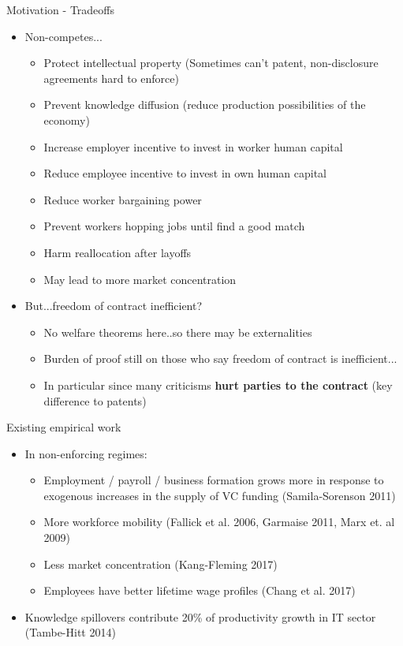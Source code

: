 \documentclass[english,usenames,dvipsnames]{beamer}
\begin{document}
\begin{frame}{Motivation - Tradeoffs}
\begin{itemize}
	
	\small
	\item Non-competes...
	\begin{itemize}
		\footnotesize
		\item Protect intellectual property (Sometimes can't patent, non-disclosure agreements hard to enforce)
		\item Prevent knowledge diffusion (reduce production possibilities of the economy)
		\item Increase employer incentive to invest in worker human capital
		\item Reduce employee incentive to invest in own human capital 
		\item Reduce worker bargaining power
		\item Prevent workers hopping jobs until find a good match
		\item Harm reallocation after layoffs
		\item May lead to more market concentration
	\end{itemize}

	\small
	\item But...freedom of contract inefficient? 
	\begin{itemize}
		\footnotesize
		\item No welfare theorems here..so there may be externalities
		\item Burden of proof still on those who say freedom of contract is inefficient...
		\item In particular since many criticisms \textbf{hurt parties to the contract} (key difference to patents)
	\end{itemize}

\end{itemize}
\end{frame}

\begin{frame}{Existing empirical work}
\begin{itemize}
	\item In non-enforcing regimes:
	\begin{itemize}
		\item Employment / payroll / business formation grows more in response to exogenous increases in the supply of VC funding (Samila-Sorenson 2011)
		\item More workforce mobility (Fallick et al. 2006, Garmaise 2011, Marx et. al 2009)
		\item Less market concentration (Kang-Fleming 2017)
		\item Employees have better lifetime wage profiles (Chang et al. 2017)
	\end{itemize}
	\item Knowledge spillovers contribute 20\% of productivity growth in IT sector (Tambe-Hitt 2014)
\end{itemize}
\end{frame}
\end{document}
